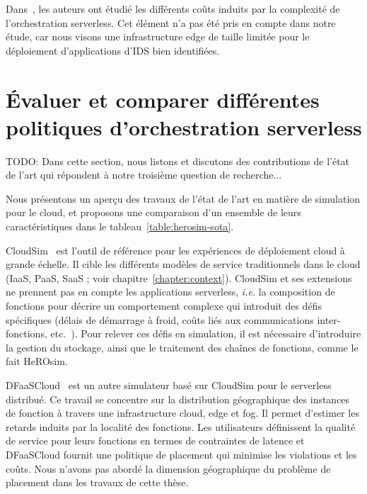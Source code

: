 Dans~\cite{fuerstIluvatarFastControl2023}, les auteurs ont étudié les différents coûts induits par la complexité de l'orchestration serverless. Cet élément n'a pas été pris en compte dans notre étude, car nous visons une infrastructure edge de taille limitée pour le déploiement d'applications d'IDS bien identifiées.

\section{Évaluer et comparer différentes politiques d'orchestration serverless}
\label{section:sota-herosim}

TODO: Dans cette section, nous listons et discutons des contributions de l'état de l'art qui répondent à notre troisième question de recherche...


Nous présentons un aperçu des travaux de l'état de l'art en matière de simulation pour le cloud, et proposons une comparaison d'un ensemble de leurs caractéristiques dans le tableau~\ref{table:herosim-sota}.

CloudSim~\cite{calheiros_cloudsim_2011} est l'outil de référence pour les expériences de déploiement cloud à grande échelle. Il cible les différents modèles de service traditionnels dans le cloud (\gls{IaaS}, \gls{PaaS}, \gls{SaaS} ; voir chapitre~\ref{chapter:context}).
CloudSim et ses extensions~\cite{calheiros_cloudsim_2011, mampage_cloudsimsc_2023, wickremasinghe_cloudanalyst_2010, jeonCloudSimExtensionSimulatingDistributed2019} ne prennent pas en compte les applications serverless, \textit{i.e.} la composition de fonctions pour décrire un comportement complexe qui introduit des défis spécifiques (délais de démarrage à froid, coûts liés aux communications inter-fonctions, etc.~\cite{wawrzoniakBoxerDataAnalytics2021a}).
Pour relever ces défis en simulation, il est nécessaire d'introduire la gestion du stockage, ainsi que le traitement des chaînes de fonctions, comme le fait HeROsim.

DFaaSCloud~\cite{jeonCloudSimExtensionSimulatingDistributed2019} est un autre simulateur basé sur CloudSim pour le serverless distribué. Ce travail se concentre sur la distribution géographique des instances de fonction à travers une infrastructure cloud, edge et fog. Il permet d'estimer les retards induits par la localité des fonctions. Les utilisateurs définissent la qualité de service pour leurs fonctions en termes de contraintes de latence et DFaaSCloud fournit une politique de placement qui minimise les violations et les coûts. Nous n'avons pas abordé la dimension géographique du problème de placement dans les travaux de cette thèse.

